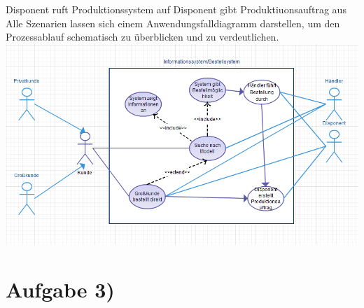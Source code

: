 \documentclass{swp1}
\begin{document}
Disponent ruft Produktionssystem auf\newline
Disponent gibt Produktiuonsauftrag aus\newline
\newline
Alle Szenarien lassen sich einem Anwendungsfalldiagramm darstellen, um den Prozessablauf schematisch zu überblicken und zu verdeutlichen.\newline
\newline
\includegraphics[scale=0.75]{Diagramm}
\newline

\section*{Aufgabe 3)}
\end{document}
